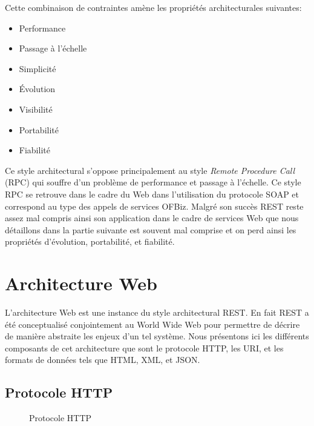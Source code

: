 \documentclass[a4paper, 11pt]{report}
\begin{document}
Cette combinaison de contraintes amène les propriétés architecturales
suivantes:
\begin{itemize}
\item Performance
\item Passage à l'échelle
\item Simplicité
\item Évolution
\item Visibilité
\item Portabilité
\item Fiabilité
\end{itemize}

Ce style architectural s'oppose principalement au style \emph{Remote
  Procedure Call} (RPC) qui souffre d'un problème de performance et
passage à l'échelle.  Ce style RPC se retrouve dans le cadre du Web
dans l'utilisation du protocole SOAP \cite{box2000simple} et
correspond au type des appels de services OFBiz. Malgré son succès
REST reste assez mal compris ainsi son application dans le cadre de
services Web que nous détaillons dans la partie suivante est souvent
mal comprise et on perd ainsi les propriétés d'évolution, portabilité,
et fiabilité.

\section{Architecture Web}

L'architecture Web est une instance du style architectural REST.  En
fait REST a été conceptualisé conjointement au World Wide Web pour
permettre de décrire de manière abstraite les enjeux d'un tel système.
Nous présentons ici les différents composants de cet architecture que
sont le protocole HTTP, les URI, et les formats de données tels que
HTML, XML, et JSON.

\subsection{Protocole HTTP}

\begin{figure}
  \centering
  \caption{Protocole HTTP}
  \label{fig:http}
\end{figure}
\end{document}
